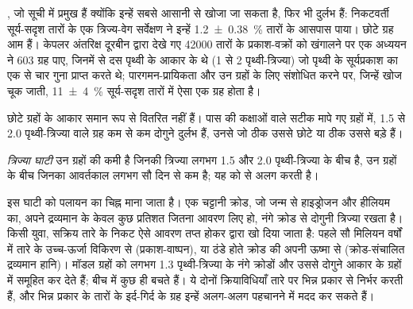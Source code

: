 , जो सूची में प्रमुख हैं क्योंकि इन्हें सबसे आसानी से
खोजा जा सकता है, फिर भी दुर्लभ हैं: निकटवर्ती सूर्य-सदृश तारों के एक त्रिज्य-वेग सर्वेक्षण ने
इन्हें \qty[separate-uncertainty=true]{1.2 \pm 0.38}{\percent} तारों के आसपास पाया। छोटे ग्रह
आम हैं। केपलर अंतरिक्ष दूरबीन द्वारा देखे गए \num{42000} तारों के प्रकाश-वक्रों को खंगालने पर एक अध्ययन ने
603 ग्रह पाए, जिनमें से दस पृथ्वी के आकार के थे (1 से 2
पृथ्वी-त्रिज्या) जो पृथ्वी के सूर्यप्रकाश का एक से चार गुना प्राप्त करते थे;
पारगमन-प्रायिकता और उन ग्रहों के लिए संशोधित करने पर, जिन्हें खोज चूक जाती,
\qty[separate-uncertainty=true]{11 \pm 4}{\percent} सूर्य-सदृश तारों में
ऐसा एक ग्रह होता है।

छोटे ग्रहों के आकार समान रूप से वितरित नहीं हैं। पास की कक्षाओं वाले
सटीक मापे गए ग्रहों में, 1.5 से 2.0 पृथ्वी-त्रिज्या वाले ग्रह कम से कम दोगुने
दुर्लभ हैं, उनसे जो ठीक उससे छोटे या ठीक उससे बड़े हैं।

\begin{definition}[त्रिज्या घाटी]\label{def:b3:exoplanets:radius-valley}
\emph{त्रिज्या घाटी} उन ग्रहों की कमी है
जिनकी त्रिज्या लगभग 1.5 और 2.0 पृथ्वी-त्रिज्या के बीच है, उन ग्रहों के बीच
जिनका आवर्तकाल लगभग सौ दिन से कम है; यह  को
 से अलग करती है।
\end{definition}

इस घाटी को पलायन का चिह्न माना जाता है। एक चट्टानी क्रोड, जो जन्म से
हाइड्रोजन और हीलियम का, अपने द्रव्यमान के केवल कुछ प्रतिशत जितना आवरण लिए हो,
नंगे क्रोड से दोगुनी त्रिज्या रखता है। किसी युवा, सक्रिय तारे के निकट ऐसे
आवरण तप्त होकर  द्वारा खो दिया जाता है:
पहले सौ मिलियन वर्षों में तारे के उच्च-ऊर्जा विकिरण से
(प्रकाश-वाष्पन), या ठंडे होते क्रोड की अपनी ऊष्मा से (क्रोड-संचालित
द्रव्यमान हानि)। मॉडल ग्रहों को लगभग 1.3 पृथ्वी-त्रिज्या के नंगे क्रोडों और
उससे दोगुने आकार के ग्रहों में समूहित कर देते हैं; बीच में कुछ ही बचते हैं।
ये दोनों क्रियाविधियाँ तारे पर भिन्न प्रकार से निर्भर करती हैं, और भिन्न प्रकार के तारों के
इर्द-गिर्द के ग्रह इन्हें अलग-अलग पहचानने में मदद कर सकते हैं।

